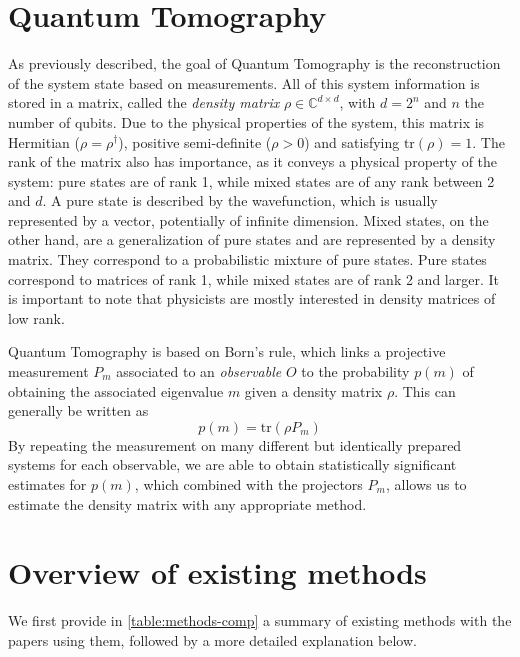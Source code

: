 \documentclass[12pt]{memoir}
\newcommand{\tr}{\text{tr}}
\begin{document}
\section{Quantum Tomography} \label{introduction:quantum-tomography}

As previously described, the goal of Quantum Tomography is the reconstruction of the system state based on measurements. All of this system information is stored in a matrix, called the \textit{density matrix} $\rho \in \mathbb{C}^{d \times d}$, with $d = 2^n$ and $n$ the number of qubits. Due to the physical properties of the system, this matrix is Hermitian ($\rho = \rho^{\dagger}$), positive semi-definite ($\rho > 0$) and satisfying $\tr(\rho) = 1$. The rank of the matrix also has importance, as it conveys a physical property of the system: pure states are of rank 1, while mixed states are of any rank between 2 and $d$. A pure state is described by the wavefunction, which is usually represented by a vector, potentially of infinite dimension. Mixed states, on the other hand, are a generalization of pure states and are represented by a density matrix. They correspond to a probabilistic mixture of pure states. Pure states correspond to matrices of rank 1, while mixed states are of rank 2 and larger. It is important to note that physicists are mostly interested in density matrices of low rank.\medbreak

Quantum Tomography is based on Born's rule, which links a projective measurement $P_m$ associated to an \textit{observable} $O$ to the probability $p(m)$ of obtaining the associated eigenvalue $m$ given a density matrix $\rho$. This can generally be written as 
\begin{equation}
    p(m) = \tr(\rho P_m)
\end{equation}
By repeating the measurement on many different but identically prepared systems for each observable, we are able to obtain statistically significant estimates for $p(m)$, which combined with the projectors $P_m$, allows us to estimate the density matrix with any appropriate method.
\section{Overview of existing methods}
We first provide in \ref{table:methods-comp} a summary of existing methods with the papers using them, followed by a more detailed explanation below.  
\end{document}
